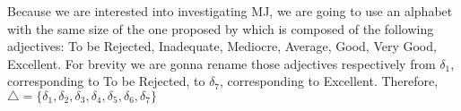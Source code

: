 %
%
%

\begin{remark}
	Because we are interested into investigating \acs{MJ}, we are going to use an alphabet with the same size of the one proposed by \citet{Balinski2011} which is composed of the following adjectives: To be Rejected, Inadequate, Mediocre, Average, Good, Very Good, Excellent. For brevity we are gonna rename those adjectives respectively from $\delta_1$, corresponding to To be Rejected, to $\delta_7$, corresponding to Excellent. Therefore, $\triangle=\{\delta_1,\delta_2, \delta_3,\delta_4,\delta_5,\delta_6,\delta_7\}$ 
\end{remark}

